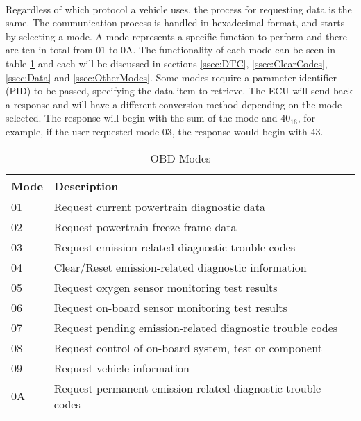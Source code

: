{		\paragraph{}{
		Regardless of which protocol a vehicle uses, the process for requesting data is the same. The communication process is handled in hexadecimal format, and starts by selecting a mode. A mode represents a specific function to perform and there are ten in total from 01 to 0A. The functionality of each mode can be seen in table \ref{tab:Modes} and each will be discussed in sections \ref{ssec:DTC}, \ref{ssec:ClearCodes}, \ref{ssec:Data} and \ref{ssec:OtherModes}. Some modes require a parameter identifier (PID) to be passed, specifying the data item to retrieve. The ECU will send back a response and will have a different conversion method depending on the mode selected. The response will begin with the sum of the mode and $40 _{16}$, for example, if the user requested mode 03, the response would begin with 43.
		}
		\begin{table}[h]
			\begin{center}				
				\begin{tabular}{| l | l |}
				\hline
				\textbf{Mode} & \textbf{Description}\\
				\hline
				01 & Request current powertrain diagnostic data\\
				\hline
				02 & Request powertrain freeze frame data\\
				\hline
				03 & Request emission-related diagnostic trouble codes\\
				\hline
				04 & Clear/Reset emission-related diagnostic information\\
				\hline
				05 & Request oxygen sensor monitoring test results\\
				\hline
				06 & Request on-board sensor monitoring test results\\
				\hline
				07 & Request pending emission-related diagnostic trouble codes\\
				\hline
				08 & Request control of on-board system, test or component\\
				\hline
				09 & Request vehicle information\\
				\hline
				0A & Request permanent emission-related diagnostic trouble codes\\
				\hline
				\end{tabular}
				\caption{OBD Modes}
				\label{tab:Modes}
			\end{center}
		\end{table}		 
		
}
